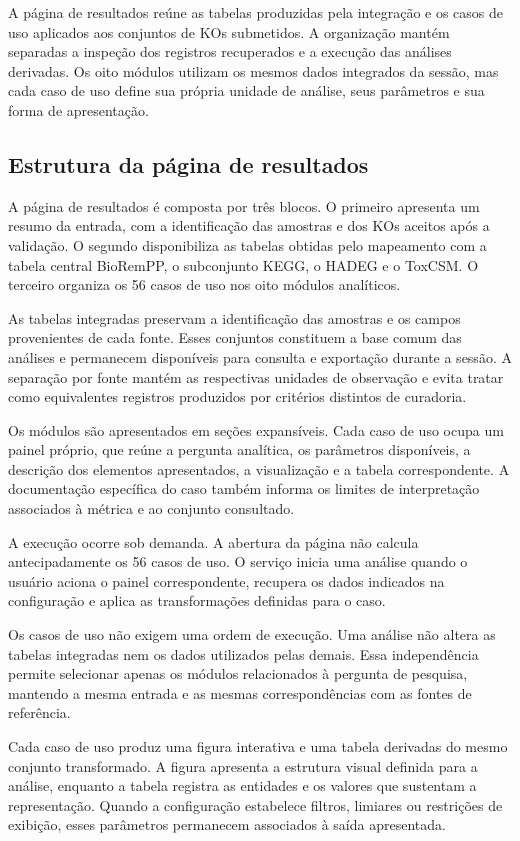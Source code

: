 A página de resultados reúne as tabelas produzidas pela integração e os casos
de uso aplicados aos conjuntos de KOs submetidos. A organização mantém
separadas a inspeção dos registros recuperados e a execução das análises
derivadas. Os oito módulos utilizam os mesmos dados integrados da sessão, mas
cada caso de uso define sua própria unidade de análise, seus parâmetros e sua
forma de apresentação.

\subsection{Estrutura da página de resultados}

A página de resultados é composta por três blocos. O primeiro apresenta um
resumo da entrada, com a identificação das amostras e dos KOs aceitos após a
validação. O segundo disponibiliza as tabelas obtidas pelo mapeamento com a
tabela central BioRemPP, o subconjunto KEGG, o HADEG e o ToxCSM. O terceiro
organiza os 56 casos de uso nos oito módulos analíticos.

As tabelas integradas preservam a identificação das amostras e os campos
provenientes de cada fonte. Esses conjuntos constituem a base comum das
análises e permanecem disponíveis para consulta e exportação durante a sessão.
A separação por fonte mantém as respectivas unidades de observação e evita
tratar como equivalentes registros produzidos por critérios distintos de
curadoria.

Os módulos são apresentados em seções expansíveis. Cada caso de uso ocupa um
painel próprio, que reúne a pergunta analítica, os parâmetros disponíveis, a
descrição dos elementos apresentados, a visualização e a tabela
correspondente. A documentação específica do caso também informa os limites
de interpretação associados à métrica e ao conjunto consultado.

A execução ocorre sob demanda. A abertura da página não calcula
antecipadamente os 56 casos de uso. O serviço inicia uma análise quando o
usuário aciona o painel correspondente, recupera os dados indicados na
configuração e aplica as transformações definidas para o caso.

Os casos de uso não exigem uma ordem de execução. Uma análise não altera as
tabelas integradas nem os dados utilizados pelas demais. Essa independência
permite selecionar apenas os módulos relacionados à pergunta de pesquisa,
mantendo a mesma entrada e as mesmas correspondências com as fontes de
referência.

Cada caso de uso produz uma figura interativa e uma tabela derivadas do mesmo
conjunto transformado. A figura apresenta a estrutura visual definida para a
análise, enquanto a tabela registra as entidades e os valores que sustentam a
representação. Quando a configuração estabelece filtros, limiares ou
restrições de exibição, esses parâmetros permanecem associados à saída
apresentada.

